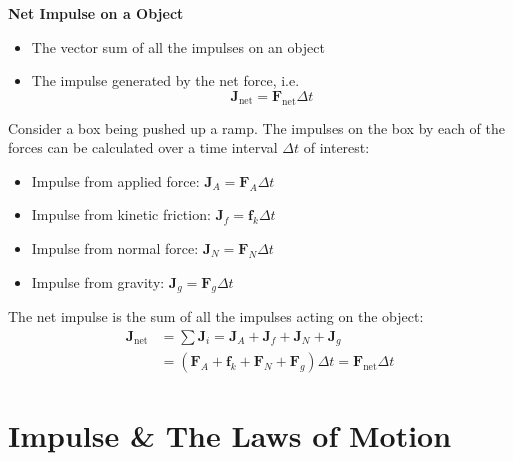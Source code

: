 \textbf{Net Impulse on a Object}
\begin{itemize}
\item The vector sum of all the impulses on an object
\item The impulse generated by the net force, i.e.
  \begin{equation}
    \boxed{
      \bm J_\text{net} = \bm F_\text{net}\Delta t
    }
  \end{equation}
\end{itemize} 

\begin{example}
  Consider a box being pushed up a ramp. The impulses on the box by each of
  the forces can be calculated over a time interval $\Delta t$ of interest:
  \begin{center}
  \end{center}
  \begin{itemize}
  \item Impulse from applied force: $\bm J_A =\bm F_A\Delta t$
  \item Impulse from kinetic friction: $\bm J_f =\bm f_k\Delta t$
  \item Impulse from normal force: $\bm J_N =\bm F_N\Delta t$
  \item Impulse from gravity: $\bm J_g =\bm F_g\Delta t$
  \end{itemize}
  
  The net impulse is the sum of all the impulses acting on the object:
  \begin{align*}
    \bm J_\text{net} &=\sum\bm J_i=\bm J_A+\bm J_f +\bm J_N + \bm J_g\\
    &=(\bm F_A+\bm f_k+\bm F_N+\bm F_g)\Delta t=\bm F_\text{net}\Delta t
  \end{align*}
\end{example}




\section{Impulse \& The Laws of Motion}
%

